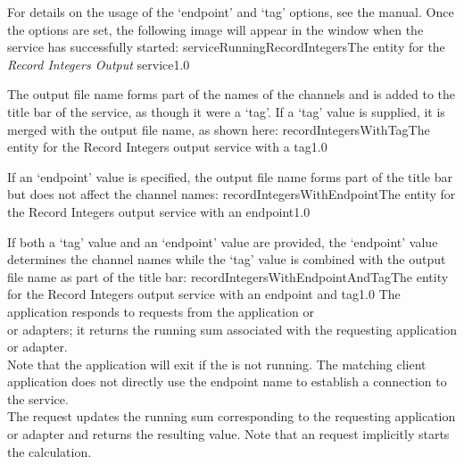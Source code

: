 For details on the usage of the `endpoint' and `tag' options, see the \emph{\CMU} manual.
Once the options are set, the following image will appear in the \emph{\CMU} window when
the service has successfully started:
%
{serviceRunningRecordIntegers}{The \emph{\CMU} entity for the \emph{Record Integers
Output} service}{1.0}

The output file name forms part of the names of the channels and is added to the title bar
of the service, as though it were a `tag'.
\condPage{}
If a `tag' value is supplied, it is merged with the output file name, as shown here:
%
{recordIntegersWithTag}{The \emph{\CMU} entity for the Record Integers output service with
a tag}{1.0}

If an `endpoint' value is specified, the output file name forms part of the title bar but
does not affect the channel names:
%
{recordIntegersWithEndpoint}{The \emph{\CMU} entity for the Record Integers output service
with an endpoint}{1.0}

If both a `tag' value and an `endpoint' value are provided, the `endpoint' value
determines the channel names while the `tag' value is combined with the output file name
as part of the title bar:
%
{recordIntegersWithEndpointAndTag}{The \emph{\CMU} entity for the Record Integers output
service with an endpoint and tag}{1.0}
\condPage
{}
The  application responds to
requests from the  application or\\
 or
 adapters; it returns the running sum
associated with the requesting application or adapter.\\

Note that the application will exit if the  is not
running.
\insertAutoAppParameters
{}
The matching client application does not directly use the endpoint name to establish a
connection to the service.\\

The  request updates the running sum
corresponding to the requesting application or adapter and returns the resulting value.
Note that an  request implicitly starts the
calculation.\\
%

